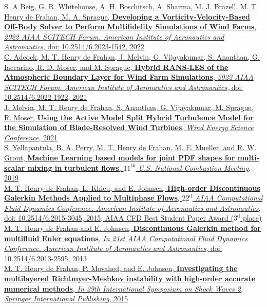 \documentclass[11pt,letterpaper]{article}
\begin{document}
\href{https://doi.org/10.2514/6.2023-1542}{S. A Beig, G. R. Whitehouse, A. H. Boschitsch, A. Sharma, M. J. Brazell, M. T Henry de Frahan, M. A. Sprague, \textbf{Developing a Vorticity-Velocity-Based Off-Body Solver to Perform Multifidelity Simulations of Wind Farms}, \textit{2022 AIAA SCITECH Forum. American Institute of Aeronautics and Astronautics}, doi: 10.2514/6.2023-1542, 2022}\\[2ex]%
\href{https://arc.aiaa.org/doi/abs/10.2514/6.2022-1922}{C. Adcock, M. T. Henry de Frahan, J. Melvin, G. Vijayakumar, S. Ananthan, G. Iaccarino, R. D. Moser, and M. Sprague, \textbf{Hybrid RANS-LES of the Atmospheric Boundary Layer for Wind Farm Simulations}, \textit{2022 AIAA SCITECH Forum. American Institute of Aeronautics and Astronautics}, doi: 10.2514/6.2022-1922, 2021}\\[2ex]%
\href{}{J. Melvin, M. T. Henry de Frahan, S. Ananthan, G. Vijayakumar, M. Sprague, R. Moser, \textbf{Using the Active Model Split Hybrid Turbulence Model for the Simulation of Blade-Resolved Wind Turbines}, \textit{Wind Energy Science Conference}, 2021}\\[2ex]%
\href{}{S. Yellapantula, B. A. Perry, M. T. Henry de Frahan, M. E. Mueller, and R. W. Grout, \textbf{Machine Learning based models for joint PDF shapes for multi-scalar mixing in turbulent flows}, \textit{$11^{\text{th}}$ U.S. National Combustion Meeting}, 2019}\\[2ex]%
\href{http://arc.aiaa.org/doi/pdf/10.2514/6.2015-3045}{M. T. Henry de Frahan, L. Khieu, and E. Johnsen, \textbf{High-order Discontinuous Galerkin Methods Applied to Multiphase Flows}, \textit{$22^{\text{d}}$ AIAA Computational Fluid Dynamics Conference. American Institute of Aeronautics and Astronautics}, doi: 10.2514/6.2015-3045, 2015, AIAA CFD Best Student Paper Award ($3^{\text{d}}$ place)}\\[2ex]%
\href{http://arc.aiaa.org/doi/pdf/10.2514/6.2013-2595}{M. T. Henry de Frahan and E. Johnsen, \textbf{Discontinuous Galerkin method for multifluid Euler equations}, \textit{In 21st AIAA Computational Fluid Dynamics Conference. American Institute of Aeronautics and Astronautics}, doi: 10.2514/6.2013-2595, 2013}\\[2ex]%
\href{https://books.google.com/books?id=6GgnCgAAQBAJ&pg=PA1095&lr=&source=gbs_selected_pages&cad=2#v=onepage&q&f=false}{M. T. Henry de Frahan, P. Movahed, and E. Johnsen, \textbf{Investigating the multilayered Richtmyer-Meshkov instability with high-order accurate numerical methods}, \textit{In 29th International Symposium on Shock Waves 2, Springer International Publishing}, 2015}\\[3ex]%
\end{document}
